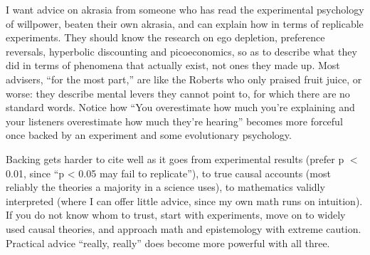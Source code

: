 I want advice on akrasia from someone who has read the experimental psychology of willpower, beaten their own akrasia, and can explain how in terms of replicable experiments. They should know the research on ego depletion, preference reversals, hyperbolic discounting and picoeconomics, so as to describe what they did in terms of phenomena that actually exist, not ones they made up. Most advisers, ``for the most part,'' are like the Roberts who only praised fruit juice, or worse: they describe mental levers they cannot point to, for which there are no standard words. Notice how ``You overestimate how much you're explaining and your listeners overestimate how much they're hearing'' becomes more forceful once backed by an experiment and some evolutionary psychology. 

Backing gets harder to cite well as it goes from experimental results (prefer p $<$ 0.01, since ``p < 0.05 may fail to replicate''), to true causal accounts (most reliably the theories a majority in a science uses), to mathematics validly interpreted (where I can offer little advice, since my own math runs on intuition). If you do not know whom to trust, start with experiments, move on to widely used causal theories, and approach math and epistemology with extreme caution. Practical advice ``really, really'' does become more powerful with all three. 
